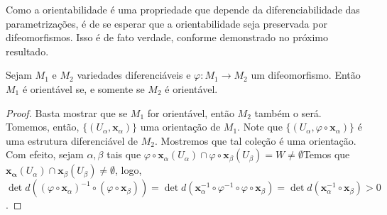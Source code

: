 	Como a orientabilidade é uma propriedade que depende da diferenciabilidade das parametrizações, é de se esperar que a orientabilidade seja preservada por difeomorfismos. Isso é de fato verdade, conforme demonstrado no próximo resultado.
	\begin{proposition}
		\label{prop:difeomorfismo-orientabilidade}
		Sejam $M_{1}$ e $M_{2}$ variedades diferenciáveis e $\varphi:M_{1}\to M_{2}$ um difeomorfismo. Então $M_{1}$ é orientável se, e somente se $M_{2}$ é orientável.
		\begin{proof}

			Basta mostrar que se $M_{1}$ for orientável, então $M_{2}$ também o será. Tomemos, então, $\{ (U_{\alpha}, \mathbf{x}_{\alpha}) \}$ uma orientação de $M_{1}$. Note que $\{ (U_{\alpha}, \varphi \circ \mathbf{x}_{\alpha}) \}$ é uma estrutura diferenciável de $M_{2}$. Mostremos que tal coleção é uma orientação. Com efeito, sejam $\alpha, \beta$ tais que $\varphi \circ \mathbf{x}_{\alpha}(U_{\alpha})\cap \varphi \circ \mathbf{x}_{\beta}(U_{\beta})=W \neq  \emptyset$Temos que $\mathbf{x_{\alpha}}(U_{\alpha}) \cap \mathbf{x}_{\beta}(U_{\beta})\neq \emptyset$, logo, $\det d((\varphi \circ \mathbf{x}_{\alpha})^{-1} \circ(\varphi \circ \mathbf{x}_{\beta}))=\det d(\mathbf{x}_{\alpha}^{-1} \circ \varphi ^{-1} \circ \varphi \circ \mathbf{x}_{\beta})=\det d(\mathbf{x}_{\alpha}^{-1} \circ \mathbf{x}_{\beta})>0$.
		\end{proof}
	\end{proposition}

\fi

